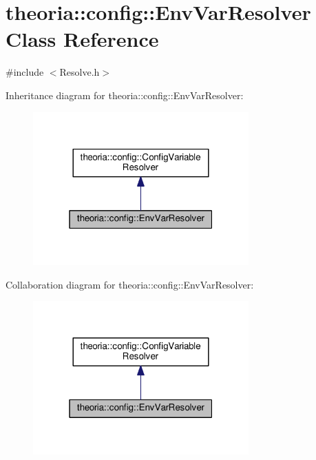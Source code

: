 \hypertarget{classtheoria_1_1config_1_1EnvVarResolver}{}\section{theoria\+:\+:config\+:\+:Env\+Var\+Resolver Class Reference}
\label{classtheoria_1_1config_1_1EnvVarResolver}


{\ttfamily \#include $<$Resolve.\+h$>$}



Inheritance diagram for theoria\+:\+:config\+:\+:Env\+Var\+Resolver\+:
\nopagebreak
\begin{figure}[H]
\begin{center}
\leavevmode
\includegraphics[width=235pt]{classtheoria_1_1config_1_1EnvVarResolver__inherit__graph}
\end{center}
\end{figure}


Collaboration diagram for theoria\+:\+:config\+:\+:Env\+Var\+Resolver\+:
\nopagebreak
\begin{figure}[H]
\begin{center}
\leavevmode
\includegraphics[width=235pt]{classtheoria_1_1config_1_1EnvVarResolver__coll__graph}
\end{center}
\end{figure}

